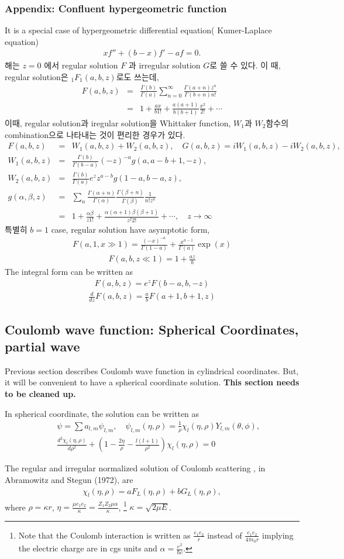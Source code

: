 \documentclass[10pt]{book}
\newcommand{\bea}{\begin{eqnarray}}
\newcommand{\eea}{\end{eqnarray}}
\newcommand{\no}{\nonumber \\}
\begin{document}
\subsubsection{Appendix: Confluent hypergeometric function}
It is a special case of hypergeometric differential equation( Kumer-Laplace equation)
\bea
x f''+(b-x)f'-af=0. 
\eea
해는 $z=0$ 에서 regular solution $F$
과 irregular solution $G$로 쓸 수 있다. 
이 때, regular solution은 $_1F_1(a,b,z)$로도 쓰는데,
\bea
F(a,b,z)&=&\frac{\Gamma(b)}{\Gamma(a)}\sum_{n=0}^\infty 
   \frac{\Gamma(a+n)z^n}{\Gamma(b+n)n!}\no 
      &=&1+\frac{ax}{b1!}+\frac{a(a+1)}{b(b+1)}\frac{x^2}{2!}+\cdots
\eea
이때, regular solution과 iregular solution을 
Whittaker function, 
$W_1$과 $W_2$함수의 combination으로 나타내는 것이 편리한 경우가 있다.
\bea
F(a,b,z)&=&W_1(a,b,z)+W_2(a,b,z),
\quad G(a,b,z)=i W_1(a,b,z)-iW_2(a,b,z),\no
W_1(a,b,z)&=&\frac{\Gamma(b)}{\Gamma(b-a)} (-z)^{-a} g(a,a-b+1,-z),\no
W_2(a,b,z)&=&\frac{\Gamma(b)}{\Gamma(a)}e^z z^{a-b}  g(1-a,b-a,z),\no
g(\alpha,\beta,z)&=& \sum_n \frac{\Gamma(\alpha+n)}{\Gamma(\alpha)}\frac{\Gamma(\beta+n)}{\Gamma(\beta)}\frac{1}{n! z^n} \no 
&=&1+\frac{\alpha\beta}{z 1!}
 +\frac{\alpha(\alpha+1)\beta(\beta+1)}{z^2 2!}+\cdots,
 \quad {z\to \infty}
\eea
특별히 $b=1$ case, regular solution have asymptotic form,
\bea
F(a,1,x\gg 1)=\frac{(-x)^{-a}}{\Gamma(1-a)}
             +\frac{x^{a-1}}{\Gamma(a)}\exp(x)
\eea
\bea 
F(a,b,z\ll 1)=1+\frac{az}{b}
\eea 
The integral form can be written as
\bea 
F(a,b,z)=e^z F(b-a,b,-z)
\eea 
\bea 
\frac{d}{dz}F(a,b,z)=\frac{a}{b}F(a+1,b+1,z)
\eea 
\subsection{Coulomb wave function: Spherical Coordinates, partial wave}
Previous section describes Coulomb wave function in cylindrical coordinates.
But, it will be convenient to have a spherical coordinate solution. 
{\bf This section needs to be cleaned up.} 

In spherical coordinate, the solution can be written as
\bea
& &\psi=\sum a_{l,m} \psi_{l,m},\quad
   \psi_{l,m}(\eta,\rho)=\frac{1}{\rho} \chi_{l}(\eta,\rho) Y_{l,m}(\theta,\phi),\no
& &\frac{d^2 \chi_l(\eta,\rho)}{d\rho^2}
   +(1-\frac{2\eta}{\rho}-\frac{l(l+1)}{\rho^2})\chi_l(\eta,\rho)=0
\eea

The regular and irregular normalized solution of Coulomb scattering
, in Abramowitz and Stegun (1972), are 
\bea
\chi_l(\eta,\rho)=a F_L(\eta,\rho)+b G_L(\eta,\rho),
\eea
where
$\rho=\kappa r$, 
$\eta=\frac{\mu e_1 e_2}{\kappa}=\frac{Z_1 Z_2 \mu\alpha}{\kappa}$,
\footnote{
Note that the Coulomb interaction is written as
$\frac{e_1 e_2}{r}$ instead of 
$\frac{e_1 e_2}{4\pi\epsilon_0 r}$
implying the electric charge are in cgs units and
$\alpha=\frac{e^2}{\hbar c}$. }
$\kappa=\sqrt{2\mu E}$. 
\end{document}
